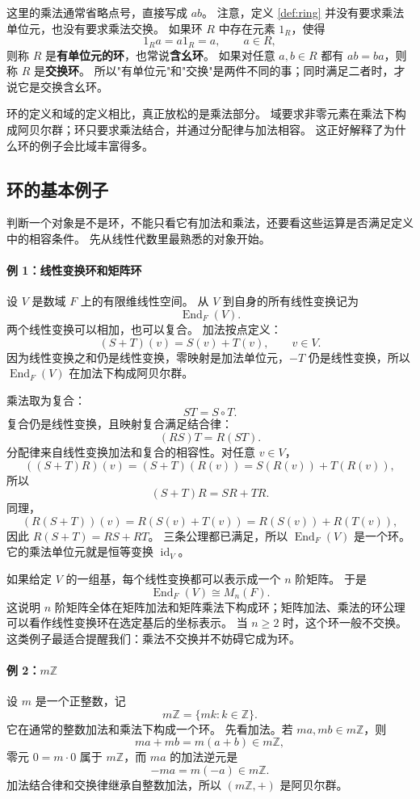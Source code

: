 这里的乘法通常省略点号，直接写成 $ab$。
注意，定义 \ref{def:ring} 并没有要求乘法单位元，也没有要求乘法交换。
如果环 $R$ 中存在元素 $1_R$，使得
\[
1_Ra=a1_R=a,\qquad a\in R,
\]
则称 $R$ 是\textbf{有单位元的环}，也常说\textbf{含幺环}。
如果对任意 $a,b\in R$ 都有 $ab=ba$，则称 $R$ 是\textbf{交换环}。
所以"有单位元"和"交换"是两件不同的事；同时满足二者时，才说它是交换含幺环。

环的定义和域的定义相比，真正放松的是乘法部分。
域要求非零元素在乘法下构成阿贝尔群；环只要求乘法结合，并通过分配律与加法相容。
这正好解释了为什么环的例子会比域丰富得多。

\subsection{环的基本例子}\label{sec:ring-basic-examples}

判断一个对象是不是环，不能只看它有加法和乘法，还要看这些运算是否满足定义中的相容条件。
先从线性代数里最熟悉的对象开始。

\paragraph*{例 1：线性变换环和矩阵环}
设 $V$ 是数域 $F$ 上的有限维线性空间。
从 $V$ 到自身的所有线性变换记为
\[
\operatorname{End}_F(V).
\]
两个线性变换可以相加，也可以复合。
加法按点定义：
\[
(S+T)(v)=S(v)+T(v),\qquad v\in V.
\]
因为线性变换之和仍是线性变换，零映射是加法单位元，$-T$ 仍是线性变换，所以 $\operatorname{End}_F(V)$ 在加法下构成阿贝尔群。

乘法取为复合：
\[
ST=S\circ T.
\]
复合仍是线性变换，且映射复合满足结合律：
\[
(RS)T=R(ST).
\]
分配律来自线性变换加法和复合的相容性。对任意 $v\in V$，
\[
((S+T)R)(v)=(S+T)(R(v))=S(R(v))+T(R(v)),
\]
所以
\[
(S+T)R=SR+TR.
\]
同理，
\[
(R(S+T))(v)=R(S(v)+T(v))=R(S(v))+R(T(v)),
\]
因此 $R(S+T)=RS+RT$。
三条公理都已满足，所以 $\operatorname{End}_F(V)$ 是一个环。
它的乘法单位元就是恒等变换 $\operatorname{id}_V$。

如果给定 $V$ 的一组基，每个线性变换都可以表示成一个 $n$ 阶矩阵。
于是
\[
\operatorname{End}_F(V)\cong M_n(F).
\]
这说明 $n$ 阶矩阵全体在矩阵加法和矩阵乘法下构成环；矩阵加法、乘法的环公理可以看作线性变换环在选定基后的坐标表示。
当 $n\geq 2$ 时，这个环一般不交换。
这类例子最适合提醒我们：乘法不交换并不妨碍它成为环。

\paragraph*{例 2：$m\mathbb Z$}
设 $m$ 是一个正整数，记
\[
m\mathbb Z=\{mk:k\in\mathbb Z\}.
\]
它在通常的整数加法和乘法下构成一个环。
先看加法。若 $ma,mb\in m\mathbb Z$，则
\[
ma+mb=m(a+b)\in m\mathbb Z,
\]
零元 $0=m\cdot0$ 属于 $m\mathbb Z$，而 $ma$ 的加法逆元是
\[
-ma=m(-a)\in m\mathbb Z.
\]
加法结合律和交换律继承自整数加法，所以 $(m\mathbb Z,+)$ 是阿贝尔群。

